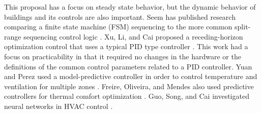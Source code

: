 This proposal has a focus on steady state behavior, but the dynamic behavior of buildings and its controls are also important. Seem has published research comparing a finite state machine (FSM) sequencing to the more common split-range sequencing control logic \cite{Seem1999}. Xu, Li, and Cai proposed a receding-horizon optimization control that uses a typical PID type controller \cite{XuMin2005}. This work had a focus on practicability in that it required no changes in the hardware or  the definitions of the common control parameters related to a PID controller. Yuan and Perez used a model-predictive controller in order to control temperature and ventilation for multiple zones \cite{Yuan2006Multiple-zoneStrategy}. Freire, Oliveira, and Mendes also used predictive controllers for thermal comfort optimization \cite{Freire2008PredictiveSavings}.  Guo, Song, and Cai investigated neural networks in HVAC control \cite{Guo2007}.